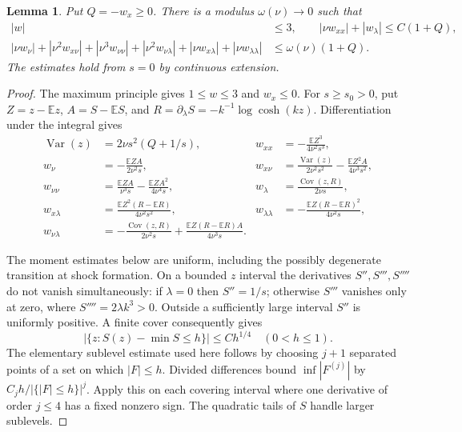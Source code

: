 \documentclass[11pt]{article}
\newtheorem{lemma}{Lemma}
\newcommand{\E}{\mathbb E}
\DeclareMathOperator{\Var}{Var}
\DeclareMathOperator{\Cov}{Cov}
\begin{document}
\begin{lemma}\label{CH}
Put $Q=-w_x\ge0$. There is a modulus $\omega(\nu)\to0$ such that
\begin{align}
 |w|&\le3,\qquad |\nu w_{xx}|+|w_\lambda|\le C(1+Q),\label{CH1}\\
 |\nu w_\nu|+|\nu^2w_{x\nu}|+|\nu^3w_{\nu\nu}|
 +|\nu^2w_{\nu\lambda}|+|\nu w_{x\lambda}|+|\nu w_{\lambda\lambda}|
 &\le\omega(\nu)(1+Q).\label{CH2}
\end{align}
The estimates hold from $s=0$ by continuous extension.
\end{lemma}
\begin{proof}
The maximum principle gives $1\le w\le3$ and $w_x\le0$. For $s\ge s_0>0$, put $Z=z-\E z$, $A=S-\E S$, and $R=\partial_\lambda S=-k^{-1}\log\cosh(kz)$. Differentiation under the integral gives
\begin{align*}
 \Var(z)&=2\nu s^2(Q+1/s),&
 w_{xx}&=-\frac{\E Z^3}{4\nu^2s^3},\\
 w_\nu&=-\frac{\E ZA}{2\nu^2s},&
 w_{x\nu}&=\frac{\Var(z)}{2\nu^2s^2}-\frac{\E Z^2A}{4\nu^3s^2},\\
 w_{\nu\nu}&=\frac{\E ZA}{\nu^3s}-\frac{\E ZA^2}{4\nu^4s},&
 w_\lambda&=\frac{\Cov(z,R)}{2\nu s},\\
 w_{x\lambda}&=\frac{\E Z^2(R-\E R)}{4\nu^2s^2},&
 w_{\lambda\lambda}&=-\frac{\E Z(R-\E R)^2}{4\nu^2s},\\
 w_{\nu\lambda}&=-\frac{\Cov(z,R)}{2\nu^2s}
 +\frac{\E Z(R-\E R)A}{4\nu^3s}.&&
\end{align*}

The moment estimates below are uniform, including the possibly degenerate transition at shock formation. On a bounded $z$ interval the derivatives $S'',S''',S''''$ do not vanish simultaneously: if $\lambda=0$ then $S''=1/s$; otherwise $S'''$ vanishes only at zero, where $S''''=2\lambda k^3>0$. Outside a sufficiently large interval $S''$ is uniformly positive. A finite cover consequently gives
\[
 |\{z:S(z)-\min S\le h\}|\le C h^{1/4}\quad(0<h\le1).
\]
The elementary sublevel estimate used here follows by choosing $j+1$ separated points of a set on which $|F|\le h$. Divided differences bound $\inf|F^{(j)}|$ by $C_jh/|\{|F|\le h\}|^j$. Apply this on each covering interval where one derivative of order $j\le4$ has a fixed nonzero sign. The quadratic tails of $S$ handle larger sublevels.


\end{proof}
\end{document}
